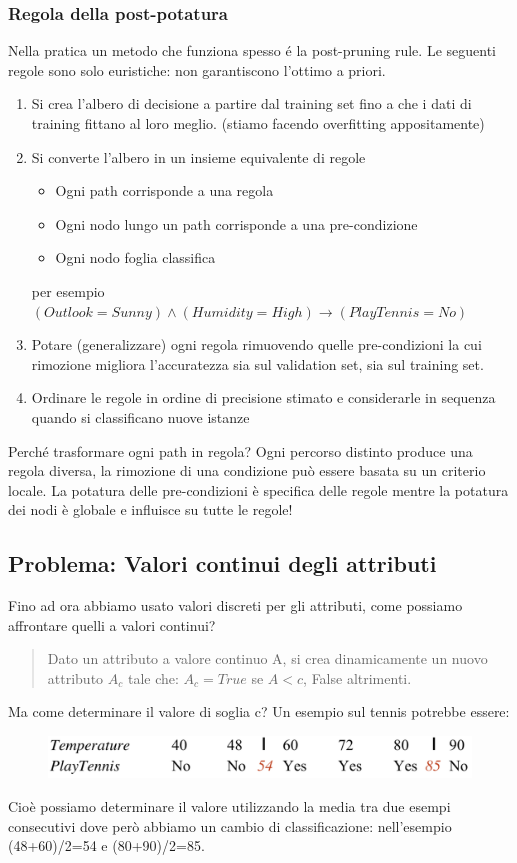 \documentclass{article}
\begin{document}
\subsubsection{Regola della post-potatura}
Nella pratica un metodo che funziona spesso é la post-pruning rule.
Le seguenti regole sono solo euristiche: non garantiscono l'ottimo a priori.
\begin{enumerate}
    \item Si crea l'albero di decisione a partire dal training set fino a che i dati di training fittano al loro meglio. (stiamo facendo overfitting appositamente)
    \item Si converte l'albero in un insieme equivalente di regole
        \begin{itemize}
            \item Ogni path corrisponde a una regola
            \item Ogni nodo lungo un path corrisponde a una pre-condizione
            \item Ogni nodo foglia classifica
        \end{itemize}
        per esempio $(Outlook=Sunny)\land(Humidity=High) \rightarrow (PlayTennis=No)$
    \item Potare (generalizzare) ogni regola rimuovendo quelle pre-condizioni la cui rimozione migliora l'accuratezza sia sul validation set, sia sul training set.
    \item Ordinare le regole in ordine di precisione stimato e considerarle in sequenza quando si classificano nuove istanze
\end{enumerate}
Perché trasformare ogni path in regola? Ogni percorso distinto produce una regola diversa, la rimozione di una condizione può essere basata su un criterio locale. La potatura delle pre-condizioni è specifica delle regole mentre la potatura dei nodi è globale e influisce su tutte le regole!

\subsection{Problema: Valori continui degli attributi}
Fino ad ora abbiamo usato valori discreti per gli attributi, come possiamo affrontare quelli a valori continui? 
\begin{quote}
    Dato un attributo a valore continuo A, si crea dinamicamente un nuovo attributo $A_c$ tale che: $A_c = True$ se $A<c$, False altrimenti.
\end{quote} 
Ma come determinare il valore di soglia c? Un esempio sul tennis potrebbe essere: 
\begin{figure}[H]
\centering
\includegraphics[scale=0.5]{Images/tempthreshold.png}
\end{figure}
Cioè possiamo determinare il valore utilizzando la media tra due esempi consecutivi dove però abbiamo un cambio di classificazione: nell'esempio (48+60)/2=54 e (80+90)/2=85.
\end{document}
